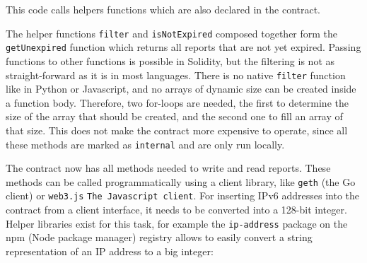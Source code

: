 

This code calls helpers functions which are also declared in the contract.



The helper functions \texttt{filter} and \texttt{isNotExpired} composed together form the \texttt{getUnexpired} function which returns all reports that are not yet expired. Passing functions to other functions is possible in Solidity, but the filtering is not as straight-forward as it is in most languages. There is no native \texttt{filter} function like in Python or Javascript, and no arrays of dynamic size can be created inside a function body. Therefore, two for-loops are needed, the first to determine the size of the array that should be created, and the second one to fill an array of that size. This does not make the contract more expensive to operate, since all these methods are marked as \texttt{internal} and are only run locally.

The contract now has all methods needed to write and read reports. These methods can be called programmatically using a client library, like \texttt{geth} (the Go client) or \texttt{web3.js} \texttt{The Javascript client}. For inserting IPv6 addresses into the contract from a client interface, it needs to be converted into a 128-bit integer. Helper libraries exist for this task, for example the \texttt{ip-address} package on the npm (Node package manager) registry allows to easily convert a string representation of an IP address to a big integer:


